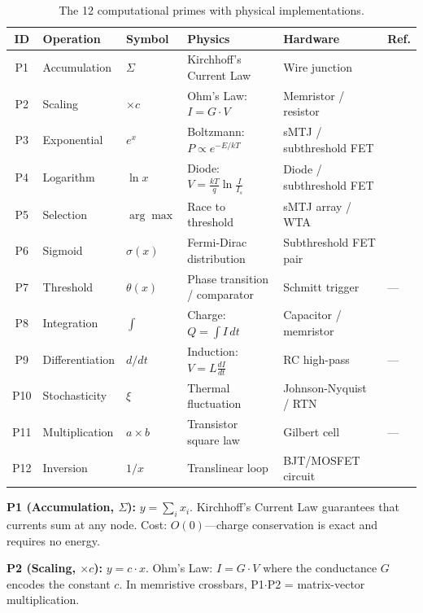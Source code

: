 \documentclass[11pt]{article}
\begin{document}
\begin{table}[t]
\centering
\caption{The 12 computational primes with physical implementations.}
\label{tab:primes}
\footnotesize
\begin{tabular}{clllll}
\toprule
ID & Operation & Symbol & Physics & Hardware & Ref. \\
\midrule
P1 & Accumulation & $\Sigma$ & Kirchhoff's Current Law & Wire junction & \cite{prezioso2015} \\
P2 & Scaling & $\times c$ & Ohm's Law: $I = G \cdot V$ & Memristor / resistor & \cite{prezioso2015} \\
P3 & Exponential & $e^x$ & Boltzmann: $P \propto e^{-E/kT}$ & sMTJ / subthreshold FET & \cite{bieg2026sba,sillman2023} \\
P4 & Logarithm & $\ln x$ & Diode: $V = \frac{kT}{q}\ln\frac{I}{I_s}$ & Diode / subthreshold FET & \cite{tageldeen2025} \\
P5 & Selection & $\arg\max$ & Race to threshold & sMTJ array / WTA & \cite{bieg2026sba,bieg2026} \\
P6 & Sigmoid & $\sigma(x)$ & Fermi-Dirac distribution & Subthreshold FET pair & \cite{mram_sigmoid2022} \\
P7 & Threshold & $\theta(x)$ & Phase transition / comparator & Schmitt trigger & --- \\
P8 & Integration & $\int$ & Charge: $Q = \int I\,dt$ & Capacitor / memristor & \cite{denram2024} \\
P9 & Differentiation & $d/dt$ & Induction: $V = L\frac{dI}{dt}$ & RC high-pass & --- \\
P10 & Stochasticity & $\xi$ & Thermal fluctuation & Johnson-Nyquist / RTN & \cite{cryptoristor2024} \\
P11 & Multiplication & $a \times b$ & Transistor square law & Gilbert cell & --- \\
P12 & Inversion & $1/x$ & Translinear loop & BJT/MOSFET circuit & \cite{tageldeen2025} \\
\bottomrule
\end{tabular}
\end{table}

\textbf{P1 (Accumulation, $\Sigma$):} $y = \sum_i x_i$. Kirchhoff's Current Law guarantees that currents sum at any node. Cost: $O(0)$---charge conservation is exact and requires no energy.

\textbf{P2 (Scaling, $\times c$):} $y = c \cdot x$. Ohm's Law: $I = G \cdot V$ where the conductance $G$ encodes the constant $c$. In memristive crossbars, P1$\cdot$P2 = matrix-vector multiplication.
\end{document}

